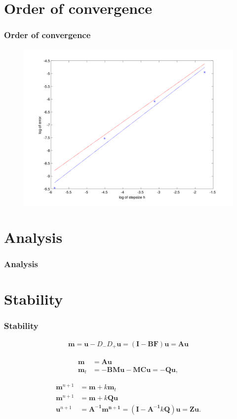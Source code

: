 \documentclass{beamer}
\begin{document}
\section*{Order of convergence}
\begin{frame}
\frametitle{Order of convergence}
\begin{figure}
\includegraphics[width=0.8\linewidth]{gfx/loglog}
\end{figure}
\end{frame}

\section*{Analysis}
\begin{frame}
\frametitle{Analysis}
\end{frame}

\section*{Stability}
\begin{frame}
\frametitle{Stability}
\begin{align*}
\bm{m} = \bm{u}-D_-D_+\bm{u} = (\bm{I}-\bm{BF})\bm{u} = \bm{A} \bm{u}
\end{align*} 

\begin{align*}
\bm{m} &= \bm{Au} \\
\bm{m}_t &= -\bm{BMu} - \bm{MCu} = \bm{-Qu},
\end{align*}

\begin{align*}
\bm{m}^{n+1} &= \bm{m} + k\bm{m}_t \\
\bm{m}^{n+1} &= \bm{m} + k\bm{Qu} \\
\bm{u}^{n+1} &= \bm{A^{-1}m^{n+1}} = \left(\bm{I} -\bm{A^{-1}}k\bm{Q}\right)\bm{u} = \bm{Zu}.
\end{align*}
\end{frame}
\end{document}
